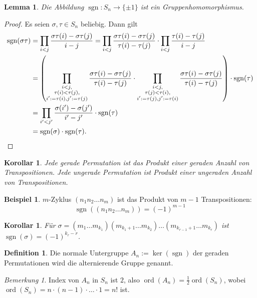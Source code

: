 \documentclass[12pt]{scrartcl} %
\DeclareMathOperator{\ord}{ord}
\DeclareMathOperator{\sgn}{sgn}
\newtheorem{lemma}[thm]{Lemma}
\newtheorem{kor}[thm]{Korollar}
\theoremstyle{definition}
\newtheorem*{defn}{Definition}
\newtheorem{ex}{Beispiel}
\theoremstyle{remark}
\newtheorem*{nb}{Bemerkung}
\begin{document}
\begin{lemma}
	Die Abbildung $\sgn:S_n\to\{\pm 1\}$ ist ein Gruppenhomomorphismus.
\end{lemma}

\begin{proof}
	Es seien $\sigma,\tau\in S_n$ beliebig. Dann gilt 
	\begin{align*}
		\sgn(\sigma\tau) &= \prod_{i<j}\frac{\sigma\tau(i)-\sigma\tau(j)}{i-j} = \prod_{i<j}\frac{\sigma\tau(i)-\sigma\tau(j)}{\tau(i)-\tau(j)}\cdot\prod_{i<j}\frac{\tau(i)-\tau(j)}{i-j} \\
		&= \left(\prod_{\substack{i<j,\\\tau(i)<\tau(j),\\ i':=\tau(i),j':=\tau(j)}}\frac{\sigma\tau(i)-\sigma\tau(j)}{\tau(i)-\tau(j)}\cdot \prod_{\substack{i<j,\\\tau(j)<\tau(i),\\ i':=\tau(j),j':=\tau(i)}}\frac{\sigma\tau(i)-\sigma\tau(j)}{\tau(i)-\tau(j)}\right)\cdot \sgn(\tau) \\
		&=\prod_{i'<j'}\frac{\sigma(i')-\sigma(j')}{i'-j'}\cdot \sgn(\tau) \\
		&= \sgn(\sigma)\cdot \sgn(\tau).\qedhere
	\end{align*}
\end{proof}

\begin{kor}
	Jede gerade Permutation ist das Produkt einer geraden Anzahl von Transpositionen.
	Jede ungerade Permutation ist Produkt einer ungeraden Anzahl von Transpositionen.
\end{kor}

\begin{ex}
	\(m\)-Zyklus $(n_1n_2 \dots n_m)$ ist das Produkt von $m-1$ Transpositionen:
	\[\sgn((n_1n_2 \dots n_m))=(-1)^{m-1}\]
\end{ex}

\begin{kor}
	Für $\sigma = (m_1 \dots m_{k_1})(m_{k_1+1} \dots m_{k_2}) \dots (m_{k_{r-1}+1} \dots m_{k_r})$ ist $\sgn(\sigma)=(-1)^{k_r-r}$.
\end{kor}

\begin{defn}
	Die normale Untergruppe $A_n:=\ker(\sgn)$ der geraden Permutationen wird die alternierende Gruppe genannt.
\end{defn}
	
\begin{nb}
	Index von $A_n$ in $S_n$ ist \(2\), also \(\ord(A_n)=\frac{1}{2}\ord(S_n)\), wobei $\ord(S_n)=n\cdot(n-1)\cdot\ldots\cdot1=n!$ ist.
\end{nb}
	
\end{document}
